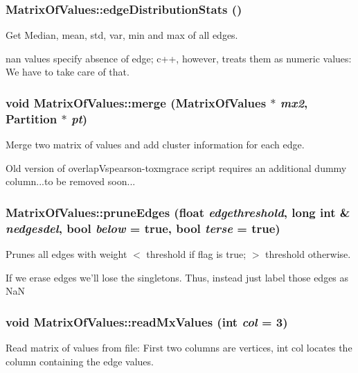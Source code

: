 \subsubsection{ Matrix\-Of\-Values::edge\-Distribution\-Stats ()}\label{classMatrixOfValues_a29}


Get Median, mean, std, var, min and max of all edges. 

nan values specify absence of edge; c++, however, treats them as numeric values: We have to take care of that. 
\subsubsection{\setlength{\rightskip}{0pt plus 5cm}void Matrix\-Of\-Values::merge ({\bf Matrix\-Of\-Values} $\ast$ {\em mx2}, Partition $\ast$ {\em pt})}\label{classMatrixOfValues_a19}


Merge two matrix of values and add cluster information for each edge. 

Old version of overlap\-Vspearson-toxmgrace script requires an additional dummy column...to be removed soon... 
\subsubsection{ Matrix\-Of\-Values::prune\-Edges (float {\em edgethreshold}, long int \& {\em nedgesdel}, bool {\em below} = true, bool {\em terse} = true)}\label{classMatrixOfValues_a8}


Prunes all edges with weight $<$ threshold if flag is true; $>$ threshold otherwise. 

If we erase edges we'll lose the singletons. Thus, instead just label those edges as Na\-N 
\subsubsection{\setlength{\rightskip}{0pt plus 5cm}void Matrix\-Of\-Values::read\-Mx\-Values (int {\em col} = 3)}\label{classMatrixOfValues_a13}


Read matrix of values from file: First two columns are vertices, int col locates the column containing the edge values. 


